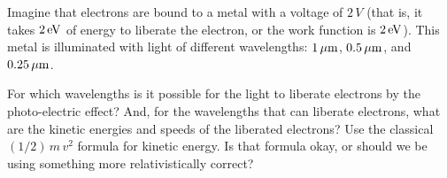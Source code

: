 \documentclass[12pt, letterpaper]{article}
\begin{document}
\begin{problem}
Imagine that electrons are bound to a metal with a voltage of $2\,V$
(that is, it takes $2\,\mathrm{eV}$ of energy to liberate the electron, or
the work function is $2\,\mathrm{eV}$). This metal is illuminated with light
of different wavelengths: $1\,\mathrm{\mu m}$, $0.5\,\mathrm{\mu m}$, and $0.25\,\mathrm{\mu m}$.

For which wavelengths is it possible for the light to liberate
electrons by the photo-electric effect?  And, for the wavelengths that
can liberate electrons, what are the kinetic energies and speeds of
the liberated electrons? Use the classical $(1/2)\,m\,v^2$ formula for
kinetic energy. Is that formula okay, or should we be using something
more relativistically correct?
\end{problem}
\end{document}
